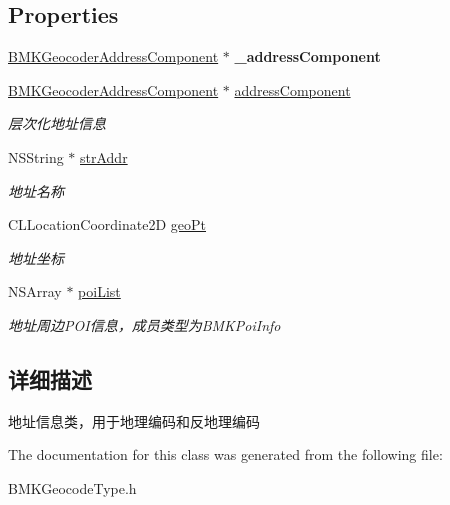 \subsection*{Properties}
\begin{DoxyCompactItemize}
\item 
\hypertarget{interface_b_m_k_addr_info_a74172df67446d717c97ae2bde1845c35}{\hyperlink{interface_b_m_k_geocoder_address_component}{B\-M\-K\-Geocoder\-Address\-Component} $\ast$ {\bfseries \-\_\-address\-Component}}\label{interface_b_m_k_addr_info_a74172df67446d717c97ae2bde1845c35}

\item 
\hypertarget{interface_b_m_k_addr_info_a9807441809f9f878c3f31840f9f94874}{\hyperlink{interface_b_m_k_geocoder_address_component}{B\-M\-K\-Geocoder\-Address\-Component} $\ast$ \hyperlink{interface_b_m_k_addr_info_a9807441809f9f878c3f31840f9f94874}{address\-Component}}\label{interface_b_m_k_addr_info_a9807441809f9f878c3f31840f9f94874}

\begin{DoxyCompactList}\small\item\em 层次化地址信息 \end{DoxyCompactList}\item 
\hypertarget{interface_b_m_k_addr_info_a69292c1009e0ffe42cf4763da7d204ef}{N\-S\-String $\ast$ \hyperlink{interface_b_m_k_addr_info_a69292c1009e0ffe42cf4763da7d204ef}{str\-Addr}}\label{interface_b_m_k_addr_info_a69292c1009e0ffe42cf4763da7d204ef}

\begin{DoxyCompactList}\small\item\em 地址名称 \end{DoxyCompactList}\item 
\hypertarget{interface_b_m_k_addr_info_a5722dacf97cdf54a4f56a2ab109156e4}{C\-L\-Location\-Coordinate2\-D \hyperlink{interface_b_m_k_addr_info_a5722dacf97cdf54a4f56a2ab109156e4}{geo\-Pt}}\label{interface_b_m_k_addr_info_a5722dacf97cdf54a4f56a2ab109156e4}

\begin{DoxyCompactList}\small\item\em 地址坐标 \end{DoxyCompactList}\item 
\hypertarget{interface_b_m_k_addr_info_a9a7bbe0c0071e04354e295d006486251}{N\-S\-Array $\ast$ \hyperlink{interface_b_m_k_addr_info_a9a7bbe0c0071e04354e295d006486251}{poi\-List}}\label{interface_b_m_k_addr_info_a9a7bbe0c0071e04354e295d006486251}

\begin{DoxyCompactList}\small\item\em 地址周边\-P\-O\-I信息，成员类型为\-B\-M\-K\-Poi\-Info \end{DoxyCompactList}\end{DoxyCompactItemize}


\subsection{详细描述}
地址信息类，用于地理编码和反地理编码 

The documentation for this class was generated from the following file\-:\begin{DoxyCompactItemize}
\item 
B\-M\-K\-Geocode\-Type.\-h\end{DoxyCompactItemize}
